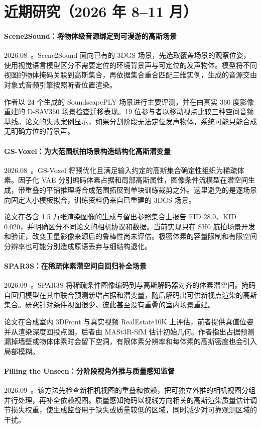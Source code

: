 \section{近期研究（2026 年 8--11 月）}
\paragraph{Scene2Sound：将物体级音源绑定到可漫游的高斯场景}
2026.08~\cite{2608_00463}。Scene2Sound 面向已有的 3DGS 场景，先选取覆盖场景的观察位姿，使用视觉语言模型区分不需要定位的环境背景声与可定位的发声物体。模型将不同视图的物体掩码关联到高斯集合，再依据集合重合匹配三维实例，生成的音源交由对象式音频引擎按照听者位置渲染。

作者以 24 个生成的 SoundscapePLY 场景进行主要评测，并在由真实 360 度影像重建的 D-SAV360 场景检查迁移表现。19 位参与者以移动视点比较三种空间音频基线。论文的失败案例显示，如果分割阶段无法定位发声物体，系统可能只能合成无明确方位的背景声。

\paragraph{GS-Voxel：为大范围航拍场景构造结构化高斯潜变量}
2026.08~\cite{2608_17988}。GS-Voxel 将预优化且满足输入约定的高斯集合确定性组织为稀疏体素。因子化 VAE 分别编码体素占据和局部高斯属性，图像条件流模型在潜空间生成，带重叠的平铺推理将合成范围拓展到单块训练裁剪之外。这里避免的是逐场景向固定大小模板拟合，训练资料仍来自已重建的 3DGS 场景。

论文在各含 1.5 万张渲染图像的生成与留出参照集合上报告 FID 28.0、KID 0.020，并明确区分不同论文的相机协议和数据。当前实现只在 SH0 航拍场景开发和验证，改变卫星影像来源后的鲁棒性尚未评估。极密体素的容量限制和有限空间分辨率也可能分别造成原语丢弃与细结构退化。

\paragraph{SPAR3S：在稀疏体素潜空间自回归补全场景}
2026.09~\cite{2609_03931}。SPAR3S 将稀疏条件图像编码到与高斯解码器对齐的体素潜空间。掩码自回归模型在其中联合预测新增占据和潜变量，随后解码出可供新视点渲染的高斯集合。研究针对条件视图很少、彼此甚至没有重叠的室内场景重建。

论文在合成室内 3DFront 与真实视频 RealEstate10K 上评估，前者提供真值位姿并从渲染深度回投点图，后者由 MASt3R-SfM 估计初始几何。作者指出占据预测漏掉墙壁或物体体素时会留下空洞，有限体素分辨率和每体素的高斯密度也会引入局部模糊。

\paragraph{Filling the Unseen：分阶段视角外推与质量感知监督}
2026.09~\cite{2609_13262}。该方法先检查新相机视图的重叠和依赖，把可独立外推的相机视图分组并行处理，再补全依赖视图。质量感知掩码以视线方向相关的高斯渲染质量估计调节损失权重，使生成监督用于缺失或质量较低的区域，同时减少对可靠观测区域的干扰。

